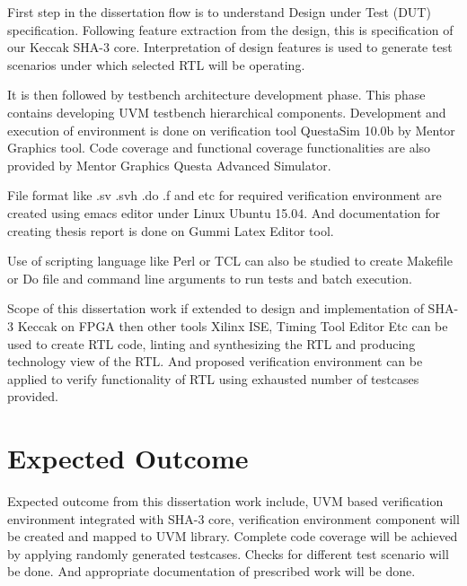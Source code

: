 First step in the dissertation flow is to understand Design under Test (DUT) specification. Following feature extraction from the design, this is specification of our Keccak SHA-3 core. Interpretation of design features is used to generate test scenarios under which selected RTL will be operating. \par

It is then followed by testbench architecture development phase. This phase contains developing UVM testbench hierarchical components. Development and execution of environment is done on verification tool QuestaSim 10.0b by Mentor Graphics tool. Code coverage and functional coverage functionalities are also provided by Mentor Graphics Questa Advanced Simulator. \par

File format like .sv .svh .do .f and etc for required verification environment are created using emacs editor under Linux Ubuntu 15.04. And documentation for creating thesis report is done on Gummi Latex Editor tool.\par

Use of scripting language like Perl or TCL can also be studied to create Makefile or Do file and command line arguments to run tests and batch execution. \par

Scope of this dissertation work if extended to design and implementation of SHA-3 Keccak on FPGA then other tools Xilinx ISE, Timing Tool Editor Etc can be used to create RTL code, linting and synthesizing the RTL and producing technology view of the RTL. And proposed verification environment can be applied to verify functionality of RTL using exhausted number of testcases provided.

\section{Expected Outcome}

Expected outcome from this dissertation work include, UVM based verification environment integrated with SHA-3 core, verification environment component will be created and mapped to UVM library. Complete code coverage will be achieved by applying randomly generated testcases. Checks for different test scenario will be done. And appropriate documentation of prescribed work will be done.